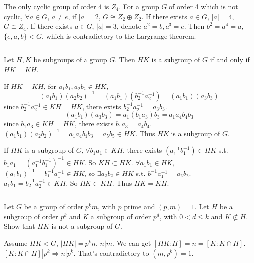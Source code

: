 \begin{answer}
    The only cyclic group of order 4 is $Z_{4}$. For a group $G$ of order 4 which is not cyclic, $\forall a\in G$, $a\neq e$, if $\left| a \right| =2$, $G\cong Z_{2}\oplus Z_{2}$. If there exists $a\in G$, $\left| a \right| =4$, $G\cong Z_{4}$. If there exists $a\in G$, $\left| a \right| =3$, denote $a^{2}=b, a^{3}=e$. Then $b^{2}=a^{4}=a$, $\{e,a,b\}<G$, which is contradictory to the Largrange theorem.
\end{answer}

$$ $$

\begin{ex}
    Let $H,K$ be subgroups of a group $G$. Then $HK$ is a subgroup of $G$ if and only if $HK=KH$.
\end{ex}

\begin{answer}
    If $HK=KH$, for $a_{1}b_{1},a_{2}b_{2}\in HK$, \[(a_{1}b_{1})(a_{2}b_{2})^{-1}=(a_{1}b_{1})(b_{2}^{-1}a_{2}^{-1})=(a_{1}b_{1})(a_{3}b_{3})\] since $b_{2}^{-1}a_{2}^{-1}\in KH=HK$, there exists $b_{2}^{-1}a_{2}^{-1}=a_{3}b_{3}$. \[(a_{1}b_{1})(a_{3}b_{3})=a_{1}(b_{1}a_{3})b_{3}=a_{1}a_{4}b_{4}b_{3}\] since $b_{1}a_{3}\in KH=HK$, there exists $b_{1}a_{3}=a_{4}b_{4}$. $(a_{1}b_{1})(a_{2}b_{2})^{-1}=a_{1}a_{4}b_{4}b_{3}=a_{5}b_{5}\in HK$. Thus $HK$ is a subgroup of $G$.

    If $HK$ is a subgroup of $G$, $\forall b_{1}a_{1}\in KH$, there exists $(a_{1}^{-1}b_{1}^{-1})\in HK$ s.t. $b_{1}a_{1}=(a_{1}^{-1}b_{1}^{-1})^{-1}\in HK$. So $KH\subset HK$. $\forall a_{1}b_{1}\in HK$, $(a_{1}b_{1})^{-1}=b_{1}^{-1}a_{1}^{-1}\in HK$, so $\exists a_{2}b_{2}\in HK$ s.t. $b_{1}^{-1}a_{1}^{-1}=a_{2}b_{2}$. $a_{1}b_{1}=b_{2}^{-1}a_{2}^{-1}\in KH$. So $HK\subset KH$. Thus $HK=KH$.
\end{answer}

$$ $$

\begin{ex}
    Let $G$ be a group of order $p^{k}m$, with $p$ prime and $(p,m)=1$. Let $H$ be a subgroup of order $p^{k}$ and $K$ a subgroup of order $p^{d}$, with $0<d\leq k$ and $K\not\subset H$. Show that $HK$ is not a subgroup of $G$.
\end{ex}

\begin{answer}
    Assume $HK<G$, $\left| HK \right| =p^{k}n$, $n|m$. We can get $\left[HK:H\right]=n=\left[K:K\cap H\right]$. $\left[K:K\cap H\right] | p^{k}\Rightarrow n|p^{k}$. That's contradictory to $(m,p^{k})=1$.
\end{answer}

